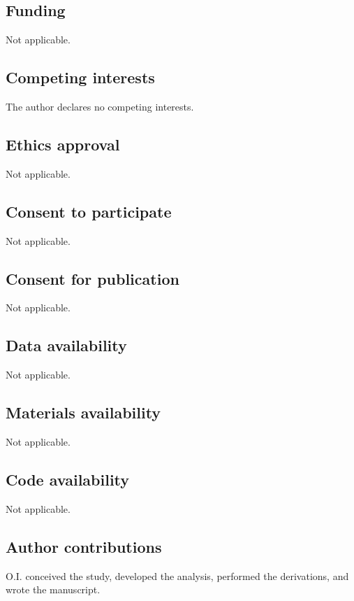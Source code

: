 \documentclass[pdflatex,sn-mathphys-num]{sn-jnl}
\begin{document}
        \backmatter

        \subsection*{Funding}
            Not applicable.

        \subsection*{Competing interests}
            The author declares no competing interests.

        \subsection*{Ethics approval}
            Not applicable.

        \subsection*{Consent to participate}
            Not applicable.

        \subsection*{Consent for publication}
            Not applicable.

        \subsection*{Data availability}
            Not applicable.

        \subsection*{Materials availability}
            Not applicable.

        \subsection*{Code availability}
            Not applicable.

        \subsection*{Author contributions}
            O.I. conceived the study, developed the analysis, performed the derivations, and wrote the manuscript.
\end{document}
